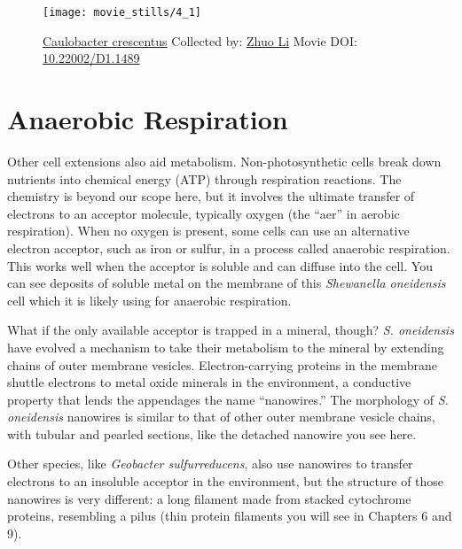\documentclass[]{tufte-book}
\begin{document}
\begin{figure}
\texttt{[image: movie\_stills/4\_1]} \caption[\protect\hyperlink{tree}{Caulobacter crescentus} Collected by:
\protect\hyperlink{zhuo_li}{Zhuo Li} Movie DOI:
\href{https://doi.org/10.22002/D1.1489}{10.22002/D1.1489}]{\protect\hyperlink{tree}{Caulobacter crescentus} Collected by:
\protect\hyperlink{zhuo_li}{Zhuo Li} Movie DOI:
\href{https://doi.org/10.22002/D1.1489}{10.22002/D1.1489}}\label{fig:4-1}
\end{figure}

\section{Anaerobic Respiration}\label{anaerobic-respiration}

Other cell extensions also aid metabolism. Non-photosynthetic cells
break down nutrients into chemical energy (ATP) through respiration
reactions. The chemistry is beyond our scope here, but it involves the
ultimate transfer of electrons to an acceptor molecule, typically oxygen
(the ``aer'' in aerobic respiration). When no oxygen is present, some
cells can use an alternative electron acceptor, such as iron or sulfur,
in a process called anaerobic respiration. This works well when the
acceptor is soluble and can diffuse into the cell. You can see deposits
of soluble metal on the membrane of this \emph{Shewanella oneidensis}
cell which it is likely using for anaerobic respiration.

What if the only available acceptor is trapped in a mineral, though?
\emph{S. oneidensis} have evolved a mechanism to take their metabolism
to the mineral by extending chains of outer membrane vesicles.
Electron-carrying proteins in the membrane shuttle electrons to metal
oxide minerals in the environment, a conductive property that lends the
appendages the name ``nanowires.'' The morphology of \emph{S.
oneidensis} nanowires is similar to that of other outer membrane vesicle
chains, with tubular and pearled sections, like the detached nanowire
you see here.

Other species, like \emph{Geobacter sulfurreducens}, also use nanowires
to transfer electrons to an insoluble acceptor in the environment, but
the structure of those nanowires is very different: a long filament made
from stacked cytochrome proteins, resembling a pilus (thin protein
filaments you will see in Chapters 6 and 9).
\end{document}
